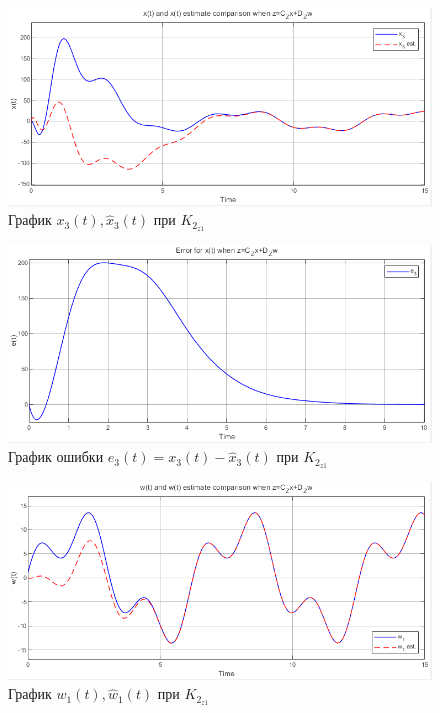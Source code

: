 \documentclass[a4paper, 12pt]{article}
\begin{document}
    \begin{figure}[H]
        \centering
        \includegraphics[scale=0.75]{3task_xxh3czdz.png}
        \captionsetup{skip=0pt}
        \caption{График $x_3(t),\hat{x}_3(t)$ при $K_{2_{z1}}$}
        \label{fig:3task_xxh3czdz}
    \end{figure}
    \begin{figure}[H]
        \centering
        \includegraphics[scale=0.75]{3task_xe3czdz.png}
        \captionsetup{skip=0pt}
        \caption{График ошибки $e_3(t)=x_3(t)-\hat{x}_3(t)$ при $K_{2_{z1}}$}
        \label{fig:3task_xe3czdz}
    \end{figure}
    \begin{figure}[H]
        \centering
        \includegraphics[scale=0.75]{3task_wwh1czdz.png}
        \captionsetup{skip=0pt}
        \caption{График $w_1(t),\hat{w}_1(t)$ при $K_{2_{z1}}$}
        \label{fig:3task_wwh1czdz}
    \end{figure}
\end{document}
